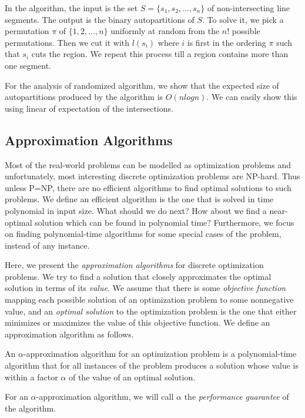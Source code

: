 In the algorithm, the input is the set $S = \{s_1, s_2, \ldots, s_n\}$ of non-intersecting line segments.
The output is the binary autopartitions of $S$. To solve it, we pick a permutation $\pi$ of $\{1,2, \ldots, n\}$ uniformly
at random from the $n!$ possible permutations. Then we cut it with $l(s_i)$ where $i$ is first in the ordering $\pi$
such that $s_i$ cuts the region. We repeat this process till a region contains more than one segment.

For the analysis of randomized algorithm, we show that the expected size of autopartitions produced by the algorithm is $O(n log n)$.
We can easily show this using linear of expectation of the intersections.

\subsection{Approximation Algorithms}

Most of the real-world problems can be modelled as optimization problems and unfortunately, most interesting discrete optimization problems are NP-hard.
Thus unless P=NP, there are no efficient algorithms to find optimal solutions to such problems. We define an efficient algorithm is the one that is solved in time polynomial in input size.
What should we do next? How about we find a near-optimal solution which can be found in polynomial time? Furthermore, we focus on finding 
polynomial-time algorithms for some special cases of the problem, instead of any instance.


Here, we present the \textit{approximation algorithms} for discrete optimization problems.
We try to find a solution that closely approximates the optimal solution in terms of its \textit{value}.
We assume that there is some \textit{objective function} mapping each possible solution of an optimization problem 
to some nonnegative value, and an \textit{optimal solution} to the optimization problem is the one 
that either minimizes or maximizes the value of this objective function. We define an approximation algorithm as follows.

\begin{definition}
 An $\alpha$-approximation algorithm for an optimization problem is a polynomial-time algorithm that for all instances of the problem produces a solution whose value 
 is within a factor $\alpha$ of the value of an optimal solution.
 \end{definition}
 
 For an $\alpha$-approximation algorithm, we will call $\alpha$ the \textit{performance guarantee} of the algorithm.
 
